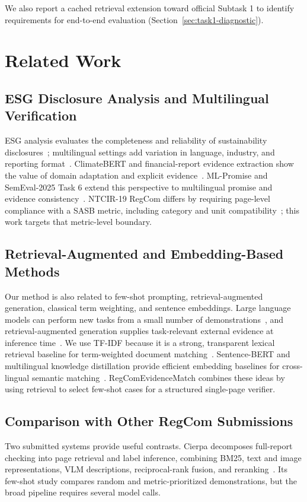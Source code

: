 \documentclass[sigconf,article]{acmart}
\newcommand{\RegComEvidenceMatch}{RegCom\-Evidence\-Match}
\newcommand{\retraug}{retrieval\allowbreak-augmented}
\begin{document}
We also report a cached retrieval extension toward official Subtask 1 to identify requirements for end-to-end evaluation (Section~\ref{sec:task1-diagnostic}).

\section{Related Work}
\subsection{ESG Disclosure Analysis and Multilingual Verification}
ESG analysis evaluates the completeness and reliability of sustainability disclosures~\cite{schmoll2025automated}; multilingual settings add variation in language, industry, and reporting format~\cite{li2024evaluating}. ClimateBERT and financial-report evidence extraction show the value of domain adaptation and explicit evidence~\cite{webersinke2022climatebert,kannan2023textual}. ML-Promise and SemEval-2025 Task 6 extend this perspective to multilingual promise and evidence consistency~\cite{seki2025mlpromise,chen2025semeval}. NTCIR-19 RegCom differs by requiring page-level compliance with a SASB metric, including category and unit compatibility~\cite{ntcir19regcom}; this work targets that metric-level boundary.

\subsection{Retrieval-Augmented and Embedding-Based Methods}
Our method is also related to few-shot prompting, \retraug{} generation, classical term weighting, and sentence embeddings. Large language models can perform new tasks from a small number of demonstrations~\cite{brown2020language}, and \retraug{} generation supplies task-relevant external evidence at inference time~\cite{lewis2020retrieval}. We use TF-IDF because it is a strong, transparent lexical retrieval baseline for term-weighted document matching~\cite{salton1988term}. Sentence-BERT and multilingual knowledge distillation provide efficient embedding baselines for cross-lingual semantic matching~\cite{reimers2019sentencebert,reimers2020multilingual}. \RegComEvidenceMatch{} combines these ideas by using retrieval to select few-shot cases for a structured single-page verifier.

\subsection{Comparison with Other RegCom Submissions}
Two submitted systems provide useful contrasts. Cierpa decomposes full-report checking into page retrieval and label inference, combining BM25, text and image representations, VLM descriptions, reciprocal-rank fusion, and reranking~\cite{endo2026cierpa}. Its few-shot study compares random and metric-prioritized demonstrations, but the broad pipeline requires several model calls.
\end{document}
